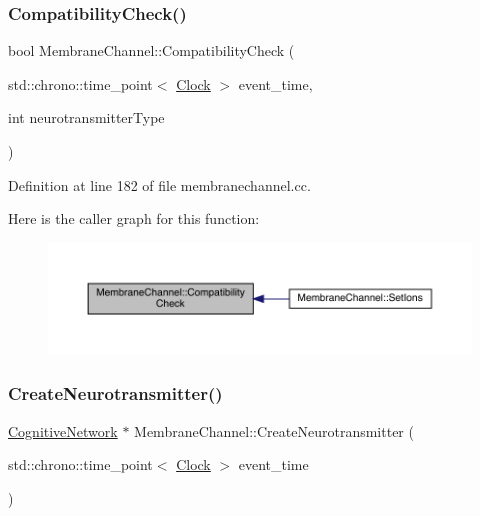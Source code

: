 \subsubsection{\texorpdfstring{Compatibility\+Check()}{CompatibilityCheck()}}
{\footnotesize\ttfamily bool Membrane\+Channel\+::\+Compatibility\+Check (\begin{DoxyParamCaption}\item[{std\+::chrono\+::time\+\_\+point$<$ \hyperlink{universe_8h_a0ef8d951d1ca5ab3cfaf7ab4c7a6fd80}{Clock} $>$}]{event\+\_\+time,  }\item[{int}]{neurotransmitter\+Type }\end{DoxyParamCaption})}



Definition at line 182 of file membranechannel.\+cc.

Here is the caller graph for this function\+:\nopagebreak
\begin{figure}[H]
\begin{center}
\leavevmode
\includegraphics[width=350pt]{class_membrane_channel_a67496ca67ad3ecae38f6b987547b1b99_icgraph}
\end{center}
\end{figure}
\mbox{\label{class_membrane_channel_aa8e78a1b0dd7c6b81cac09d33f01e6c2}} 
\subsubsection{\texorpdfstring{Create\+Neurotransmitter()}{CreateNeurotransmitter()}}
{\footnotesize\ttfamily \hyperlink{class_cognitive_network}{Cognitive\+Network} $\ast$ Membrane\+Channel\+::\+Create\+Neurotransmitter (\begin{DoxyParamCaption}\item[{std\+::chrono\+::time\+\_\+point$<$ \hyperlink{universe_8h_a0ef8d951d1ca5ab3cfaf7ab4c7a6fd80}{Clock} $>$}]{event\+\_\+time }\end{DoxyParamCaption})}



